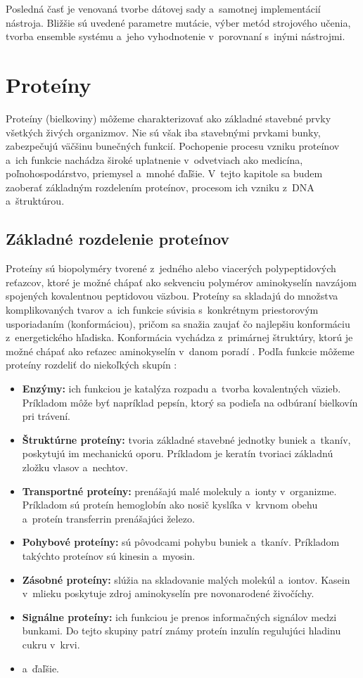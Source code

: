 Posledná časť je venovaná tvorbe dátovej sady a~samotnej implementácií nástroja. Bližšie sú uvedené parametre mutácie, výber metód strojového učenia, tvorba ensemble systému a~jeho vyhodnotenie v~porovnaní s~inými nástrojmi.


\chapter{Proteíny}

Proteíny (bielkoviny) môžeme charakterizovať ako základné stavebné prvky všetkých živých organizmov. Nie sú však iba stavebnými prvkami bunky, zabezpečujú väčšinu bunečných funkcií. Pochopenie procesu vzniku proteínov a~ich funkcie nachádza široké uplatnenie v~odvetviach ako medicína, poľnohospodárstvo, priemysel a~mnohé ďaľšie. 
V~tejto kapitole sa budem zaoberať základným rozdelením proteínov, procesom ich vzniku z~DNA a~štruktúrou.

\section{Základné rozdelenie proteínov}

Proteíny sú biopolyméry tvorené z~jedného alebo viacerých polypeptidových reťazcov, ktoré je možné chápať ako sekvenciu polymérov aminokyselín navzájom spojených kovalentnou peptidovou väzbou. Proteíny sa skladajú do množstva komplikovaných tvarov a~ich funkcie súvisia s~konkrétnym priestorovým usporiadaním (konformáciou), pričom sa snažia zaujať čo najlepšiu konformáciu z~energetického hľadiska. Konformácia vychádza z~primárnej štruktúry, ktorú je možné chápať ako reťazec aminokyselín v~danom poradí \cite{proteiny}. Podľa funkcie môžeme proteíny rozdeliť do niekoľkých skupín \cite{proteiny}:  
\begin{itemize}
	\item \textbf{Enzýmy:} ich funkciou je katalýza rozpadu a~tvorba kovalentných väzieb. Príkladom môže byť napríklad pepsín, ktorý sa podieľa na odbúraní bielkovín pri trávení.
	\item \textbf{Štruktúrne proteíny:} tvoria základné stavebné jednotky buniek a~tkanív, poskytujú im mechanickú oporu. Príkladom je keratín tvoriaci základnú zložku vlasov a~nechtov.
	\item \textbf{Transportné proteíny:} prenášajú malé molekuly a~ionty v~organizme. Príkladom sú proteín hemoglobín ako nosič kyslíka v~krvnom obehu a~proteín transferrin prenášajúci železo.
	\item \textbf{Pohybové proteíny:} sú pôvodcami pohybu buniek a~tkanív. Príkladom takýchto proteínov sú kinesin a~myosin.
	\item \textbf{Zásobné proteíny:} slúžia na skladovanie malých molekúl a~iontov. Kasein v~mlieku poskytuje zdroj aminokyselín pre novonarodené živočíchy. 
	\item \textbf{Signálne proteíny:} ich funkciou je prenos informačných signálov medzi bunkami. Do tejto skupiny patrí známy proteín inzulín regulujúci hladinu cukru v~krvi.
	\item a~ďaľšie.
\end{itemize}

